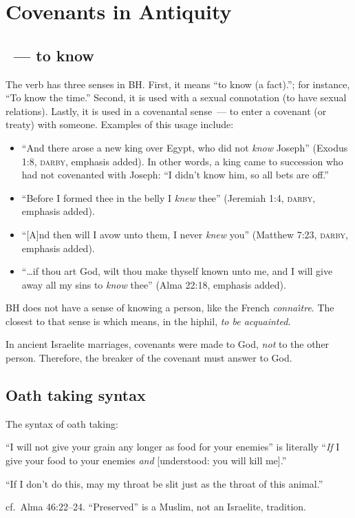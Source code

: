 \chapter{Covenants in Antiquity}\label{app:covenants-in-antiquity}
\section{~--- to know}
The verb  has three senses in BH. First, it means ``to know (a fact).''; for instance, ``To know the time.'' Second, it is used with a sexual connotation (to have sexual relations). Lastly, it is used in a covenantal sense~--- to enter a covenant (or treaty) with someone. Examples of this usage include:
\begin{itemize}
    \item ``And there arose a new king over Egypt, who did not \emph{know} Joseph'' (Exodus 1:8, \textsc{darby}, emphasis added). In other words, a king came to succession who had not covenanted with Joseph: ``I didn't know him, so all bets are off.''
    \item ``Before I formed thee in the belly I \emph{knew} thee'' (Jeremiah 1:4, \textsc{darby}, emphasis added).
    \item ``[A]nd then will I avow unto them, I never \emph{knew} you'' (Matthew 7:23, \textsc{darby}, emphasis added).
    \item ``\dots if thou art God, wilt thou make thyself known unto me, and I will give away all my sins to \emph{know} thee'' (Alma 22:18, emphasis added).
\end{itemize}

BH does not have a sense of knowing a person, like the French \emph{conna\^\i tre}. The closest to that sense is  which means, in the hiphil, \emph{to be acquainted}.

In ancient Israelite marriages, covenants were made to God, \emph{not} to the other person. Therefore, the breaker of the covenant must answer to God.

\section{Oath taking syntax}
The syntax of oath taking:

``I will not give your grain any longer as food for your enemies'' is literally ``\emph{If} I give your food to your enemies \emph{and} [understood: you will kill me].''

``If I don't do this, may my throat be slit just as the throat of this animal.''

cf.\ Alma 46:22--24. ``Preserved'' is a Muslim, not an Israelite, tradition.
